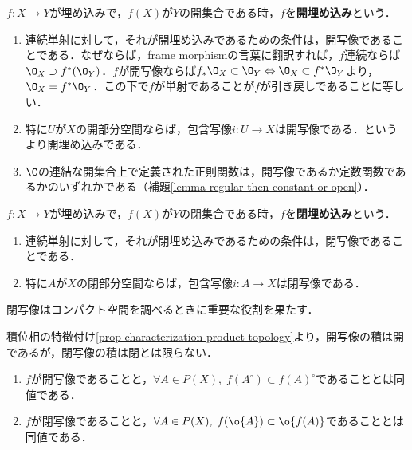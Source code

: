 \documentclass[uplatex,dvipdfmx]{jsreport}
\begin{document}
\begin{remark}\label{remark-open-imbedding}
    $f:X\to Y$が埋め込みで，$f(X)$が$Y$の開集合である時，$f$を\textbf{開埋め込み}という．
    \begin{enumerate}
        \item 連続単射に対して，それが開埋め込みであるための条件は，開写像であることである．なぜならば，frame morphismの言葉に翻訳すれば，$f$連続ならば$\O_X\supset f^*(\O_Y)$．$f$が開写像ならば$f_*\O_X\subset\O_Y\Leftrightarrow \O_X\subset f^*\O_Y$より，$\O_X=f^*\O_Y$．この下で$f$が単射であることが$f$が引き戻しであることに等しい．
        \item 特に$U$が$X$の開部分空間ならば，包含写像$i:U\to X$は開写像である．というより開埋め込みである．
        \item $\C$の連結な開集合上で定義された正則関数は，開写像であるか定数関数であるかのいずれかである（補題\ref{lemma-regular-then-constant-or-open}）．
    \end{enumerate}
\end{remark}

\begin{remark}
    $f:X\to Y$が埋め込みで，$f(X)$が$Y$の閉集合である時，$f$を\textbf{閉埋め込み}という．
    \begin{enumerate}
        \item 連続単射に対して，それが閉埋め込みであるための条件は，閉写像であることである．
        \item 特に$A$が$X$の閉部分空間ならば，包含写像$i:A\to X$は閉写像である．
    \end{enumerate}
    閉写像はコンパクト空間を調べるときに重要な役割を果たす．
\end{remark}

\begin{lemma}
    積位相の特徴付け\ref{prop-characterization-product-topology}より，開写像の積は開であるが，閉写像の積は閉とは限らない．
\end{lemma}

\begin{proposition}\mbox{}
    \begin{enumerate}
        \item $f$が開写像であることと，$\forall A\in P(X),\;f(A^\circ)\subset f(A)^\circ$であることとは同値である．
        \item $f$が閉写像であることと，$\forall A\in P(X),\;f(\o{A})\subset \o{f(A)}$であることとは同値である．
    \end{enumerate}
\end{proposition}
\end{document}
